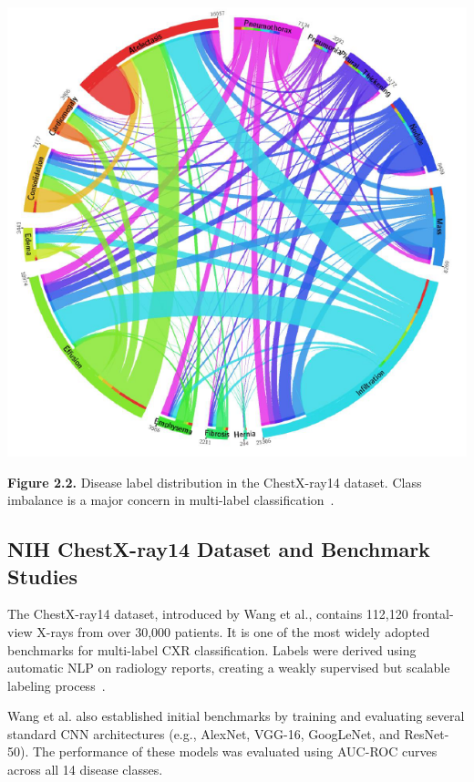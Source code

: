\documentclass[12pt]{article}
\begin{document}
\begin{multicols}{2}
\begin{center}
    \includegraphics[width=\linewidth]{figure2.2.png}
    
    \textbf{Figure 2.2.} Disease label distribution in the ChestX-ray14 dataset. Class imbalance is a major concern in multi-label classification~\cite{wang2017chestx}.
\end{center}

\subsection{NIH ChestX-ray14 Dataset and Benchmark Studies}

The ChestX-ray14 dataset, introduced by Wang et al., contains 112,120 frontal-view X-rays from over 30,000 patients. It is one of the most widely adopted benchmarks for multi-label CXR classification. Labels were derived using automatic NLP on radiology reports, creating a weakly supervised but scalable labeling process~\cite{wang2017chestx}.

Wang et al. also established initial benchmarks by training and evaluating several standard CNN architectures (e.g., AlexNet, VGG-16, GoogLeNet, and ResNet-50). The performance of these models was evaluated using AUC-ROC curves across all 14 disease classes.


\end{multicols}
\end{document}
